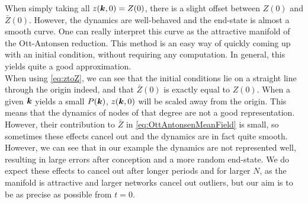 
 
When simply taking all $z({\boldsymbol{k}}, 0) = Z(0)$, there is a slight offset between $Z(0)$ and $\bar{Z}(0)$. However, the dynamics are well-behaved and the end-state is almost a smooth curve. One can really interpret this curve as the attractive manifold of the Ott-Antonsen reduction. This method is an easy way of quickly coming up with an initial condition, without requiring any computation. In general, this yields quite a good approximation. \\

When using \eqref{eq:ztoZ}, we can see that the initial conditions lie on a straight line through the origin indeed, and that $\bar{Z}(0)$ is exactly equal to $Z(0)$. When a given ${\boldsymbol{k}}$ yields a small $P({\boldsymbol{k}})$, $z({\boldsymbol{k}},0)$ will be scaled away from the origin. This means that the dynamics of nodes of that degree are not a good representation. However, their contribution to $\bar{Z}$ in \eqref{eq:OttAntonsenMeanField} is small, so sometimes these effects cancel out and the dynamics are in fact quite smooth. However, we can see that in our example the dynamics are not represented well, resulting in large errors after conception and a more random end-state. We do expect these effects to cancel out after longer periods and for larger $N$, as the manifold is attractive and larger networks cancel out outliers, but our aim is to be as precise as possible from $t=0$. \\


